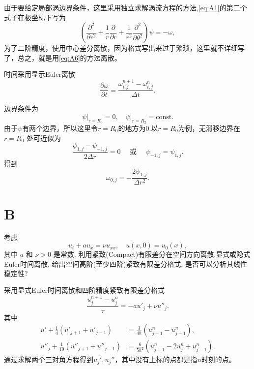 \documentclass[12pt]{article}
\begin{document}
由于要给定局部涡边界条件，这里采用独立求解涡流方程的方法,\cref{eq:A1}的第二个式子在极坐标下写为
\begin{equation}
	\left(\frac{\partial^2}{\partial r^2} + \frac{1}{r}\frac{\partial}{\partial r} + \frac{1}{r^2}\frac{\partial^2}{\partial \theta^2} \right)\psi = - \omega,
\end{equation}
为了二阶精度，使用中心差分离散，因为格式写出来过于繁琐，这里就不详细写了，总之，就是用\cref{eq:A6}的方法离散。

时间采用显示Euler离散
\begin{equation}
	\frac{\partial \omega}{\partial t} = \frac{\omega^{n+1}_{i,j}-\omega^{n}_{i,j}}{\Delta t}.
\end{equation}

边界条件为
\begin{equation}
	\psi \big|_{r=R_0} = 0,\quad \psi \big|_{r=R_2} = \mathrm{const}.
\end{equation}
由于$\psi$有两个边界，所以这里令$r=R_0$的地方为0.以$r=R_0$为例，无滑移边界在 $r=R_0$ 处可近似为
\begin{equation}
	\frac{\psi_{1, j}-\psi_{-1,j}}{2 \Delta r}=0 \quad \text { 或 } \quad \psi_{-1,j}=\psi_{1, j}.
\end{equation}
得到
\begin{equation}
	\omega_{0,j} = -\frac{2\psi_{1,j}}{\Delta r^2}.
\end{equation}


\section{B}

考虑
\begin{equation}
	u_{t}+a u_{x}=\nu u_{x x}, \quad u(x, 0)=u_{0}(x),
\end{equation}
其中 $a$ 和 $\nu>0$ 是常数. 利用紧致(Compact)有限差分在空间方向离散,显式或隐式Euler时间离散, 给出空间高阶(至少四阶)紧致有限差分格式. 是否可以分析其线性稳定性?

采用显式Euler时间离散和四阶精度紧致有限差分格式
\begin{equation}
	\frac{u^{n+1}_{j}-u^{n}_{j}}{\tau} = -au'_j + \nu u''_j.
	\label{eq:B1}
\end{equation}
其中\cite{CHU1998370}
\begin{equation}
	\begin{aligned}
		u'+\frac{1}{4}\left(u'_{j+1}+u'_{j-1}\right)       & =\frac{3}{4h} \left(u^n_{j+1}-u^n_{j-1}\right),         \\
		u''_j+\frac{1}{10}\left(u''_{j+1}+u''_{j-1}\right) & =\frac{6}{5h^2}\left(u^n_{j+1}-2u^n_j+u^n_{j-1}\right).
	\end{aligned}
\end{equation}
通过求解两个三对角方程得到$u_j',u_j''$，其中没有上标的点都是指$n$时刻的点。
\end{document}

